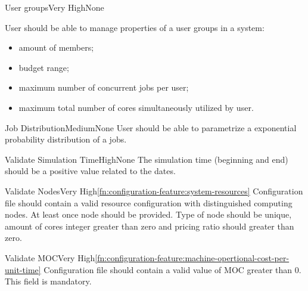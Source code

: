 	\begin{functional}{User groups}{Very High}{None}
		\label{fn:configuration-feature:user-groups}
		{
			User should be able to manage properties of a user groups in a system:
			\begin{itemize}
				\item amount of members;
				\item budget range;
				\item maximum number of concurrent jobs per user;
				\item maximum total number of cores simultaneously utilized by user.
			\end{itemize} 
		}
	\end{functional}

	\begin{functional}{Job Distribution}{Medium}{None}
		\label{fn:configuration-feature:job-distribution}
		{
			User should be able to parametrize a exponential probability distribution of a jobs. 
		}
	\end{functional}

		
	\begin{functional}{Validate Simulation Time}{High}{None}
		\label{fn:configuration-feature:validate-simulation-time}
		{
			The simulation time (beginning and end) should be a positive value related to the dates. 
		}
	\end{functional}

	\begin{functional}{Validate Nodes}{Very High}{\ref{fn:configuration-feature:system-resources}}
		\label{fn:configuration-feature:valid-nodes}
		{
			Configuration file should contain a valid resource configuration with distinguished \gls{computing node}s. At least once node should be provided. Type of node should be unique, amount of cores integer greater than zero and pricing ratio should greater than zero.  
		}
	\end{functional}

	\begin{functional}{Validate \gls{MOC}}{Very High}{\ref{fn:configuration-feature:machine-opertional-cost-per-unit-time}}
		\label{fn:configuration-feature:valid-moc}
		{
			Configuration file should contain a valid value of \gls{MOC} greater than $0$. This field is mandatory.
		}
	\end{functional}

